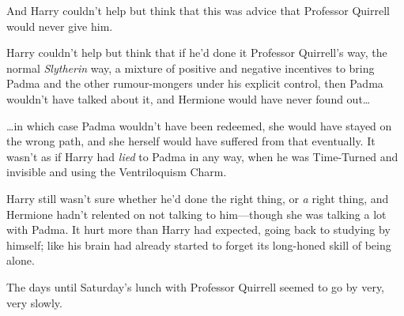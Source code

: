 And Harry couldn’t help but think that this was advice that Professor Quirrell
would never give him.

Harry couldn’t help but think that if he’d done it Professor Quirrell’s way,
the normal \emph{Slytherin} way, a mixture of positive and negative incentives
to bring Padma and the other rumour-mongers under his explicit control, then
Padma wouldn’t have talked about it, and Hermione would have never found
out…

…in which case Padma wouldn’t have been redeemed, she would have stayed
on the wrong path, and she herself would have suffered from that eventually. It
wasn’t as if Harry had \emph{lied} to Padma in any way, when he was Time-Turned
and invisible and using the Ventriloquism Charm.

Harry still wasn’t sure whether he’d done the right thing, or \emph{a} right
thing, and Hermione hadn’t relented on not talking to him—though she was
talking a lot with Padma. It hurt more than Harry had expected, going back to
studying by himself; like his brain had already started to forget its
long-honed skill of being alone.

The days until Saturday’s lunch with Professor Quirrell seemed to go by very,
very slowly.
